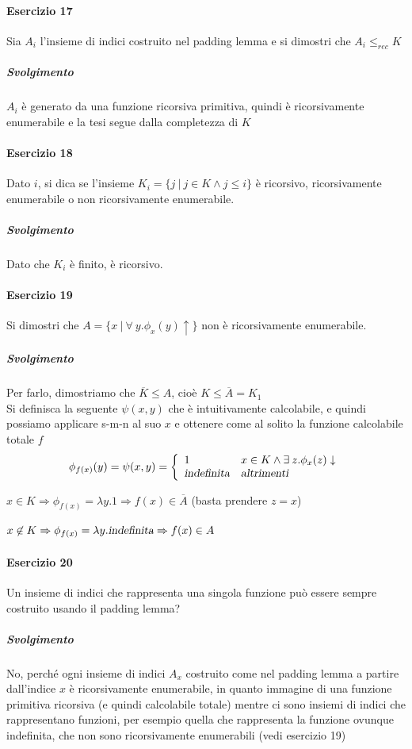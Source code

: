 \documentclass[10pt]{book}
\begin{document}
\paragraph{Esercizio 17} Sia $A_i$ l'insieme di indici costruito nel padding lemma e si dimostri che $A_i \leq_{rec} K$
\subparagraph{Svolgimento} $A_i$ è generato da una funzione ricorsiva primitiva, quindi è ricorsivamente enumerabile e la tesi segue dalla completezza di $K$
\paragraph{Esercizio 18} Dato $i$, si dica se l'insieme $K_i = \{j\:|\:j\in K \wedge j \leq i\}$ è ricorsivo, ricorsivamente enumerabile o non ricorsivamente enumerabile.
\subparagraph{Svolgimento} Dato che $K_i$ è finito, è ricorsivo.
\paragraph{Esercizio 19} Si dimostri che $A = \{x\:|\:\forall\:y.\phi_x(y)\uparrow\}$ non è ricorsivamente enumerabile.
\subparagraph{Svolgimento} Per farlo, dimostriamo che $\overline{K} \leq A$, cioè $K \leq \overline{A} = K_1$\\
Si definisca la seguente $\psi(x,y)$ che è intuitivamente calcolabile, e quindi possiamo applicare s-m-n al suo $x$ e ottenere come al solito la funzione calcolabile totale $f$
$$\phi_{f(x)}(y) = \psi(x,y) = \left\{\begin{array}{l l}
1&x\in K \wedge \exists\:z.\phi_x(z)\downarrow\\
\textsl{indefinita}&\textsl{altrimenti}
\end{array}\right.$$
\begin{list}{}{}
	\item $x\in K\Rightarrow \phi_{f(x)} = \lambda y.1\Rightarrow f(x)\in\overline{A}$ (basta prendere $z = x$)
	\item $x\not\in K\Rightarrow \phi_{f(x)} = \lambda y.\textsl{indefinita}\Rightarrow f(x)\in A$
\end{list}
\paragraph{Esercizio 20} Un insieme di indici che rappresenta una singola funzione può essere sempre costruito usando il padding lemma?
\subparagraph{Svolgimento} No, perché ogni insieme di indici $A_x$ costruito come nel padding lemma a partire dall'indice $x$ è ricorsivamente enumerabile, in quanto immagine di una funzione primitiva ricorsiva (e quindi calcolabile totale) mentre ci sono insiemi di indici che rappresentano funzioni, per esempio quella che rappresenta la funzione ovunque indefinita, che non sono ricorsivamente enumerabili (vedi esercizio 19)
\end{document}
